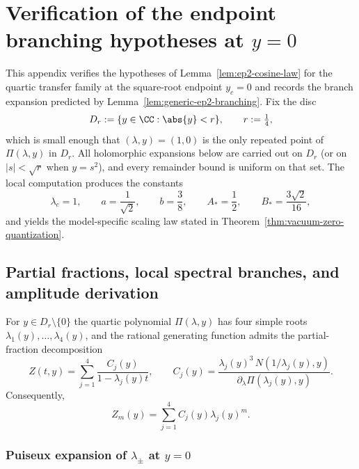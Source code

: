 \section{Verification of the endpoint branching hypotheses at \texorpdfstring{\(y=0\)}{y=0}}\label{app:vacuum-edge}

This appendix verifies the hypotheses of Lemma~\ref{lem:ep2-cosine-law} for the quartic transfer family at the square-root endpoint $y_c=0$ and records the branch expansion predicted by Lemma~\ref{lem:generic-ep2-branching}.
Fix the disc
\[
D_r:=\{y\in\CC:\abs{y}<r\},\qquad r:=\tfrac14,
\]
which is small enough that $(\lambda,y)=(1,0)$ is the only repeated point of $\Pi(\lambda,y)$ in $D_r$.
All holomorphic expansions below are carried out on $D_r$ (or on $|s|<\sqrt{r}$ when $y=s^2$), and every remainder bound is uniform on that set.
The local computation produces the constants
\begin{equation}\label{eq:appendix-cosine-constants}
\lambda_c=1,\qquad
a=\frac{1}{\sqrt2},\qquad
b=\frac38,\qquad
A_*=\frac12,\qquad
B_*=\frac{3\sqrt2}{16},
\end{equation}
and yields the model-specific scaling law stated in Theorem~\ref{thm:vacuum-zero-quantization}.

\subsection{Partial fractions, local spectral branches, and amplitude derivation}

For $y\in D_r\setminus\{0\}$ the quartic polynomial $\Pi(\lambda,y)$ has four simple roots $\lambda_1(y),\dots,\lambda_4(y)$, and the rational generating function admits the partial-fraction decomposition
\begin{equation}\label{eq:partial-fractions}
Z(t,y)=\sum_{j=1}^4 \frac{C_j(y)}{1-\lambda_j(y)t},
\qquad
C_j(y)=\frac{\lambda_j(y)^3\,N(1/\lambda_j(y),y)}{\partial_\lambda\Pi(\lambda_j(y),y)}.
\end{equation}
Consequently,
\begin{equation}\label{eq:spectral-decomposition}
Z_m(y)=\sum_{j=1}^4 C_j(y)\lambda_j(y)^m.
\end{equation}

\subsubsection*{Puiseux expansion of \texorpdfstring{$\lambda_\pm$}{lambda\_pm} at \texorpdfstring{$y=0$}{y=0}}

